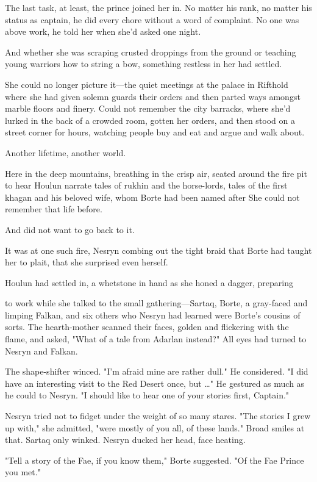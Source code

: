 The last task, at least, the prince joined her in. No matter his rank, no matter his status as captain, he did every chore without a word of complaint. No one was above work, he told her when she'd asked one night.

And whether she was scraping crusted droppings from the ground or teaching young warriors how to string a bow, something restless in her had settled.

She could no longer picture it---the quiet meetings at the palace in Rifthold where she had given solemn guards their orders and then parted ways amongst marble floors and finery. Could not remember the city barracks, where she'd lurked in the back of a crowded room, gotten her orders, and then stood on a street corner for hours, watching people buy and eat and argue and walk about.

Another lifetime, another world.

Here in the deep mountains, breathing in the crisp air, seated around the fire pit to hear Houlun narrate tales of rukhin and the horse-lords, tales of the first khagan and his beloved wife, whom Borte had been named after  She could not remember that life before.

And did not want to go back to it.

It was at one such fire, Nesryn combing out the tight braid that Borte had taught her to plait, that she surprised even herself.

Houlun had settled in, a whetstone in hand as she honed a dagger, preparing

to work while she talked to the small gathering---Sartaq, Borte, a gray-faced and limping Falkan, and six others who Nesryn had learned were Borte's cousins of sorts. The hearth-mother scanned their faces, golden and flickering with the flame, and asked, "What of a tale from Adarlan instead?" All eyes had turned to Nesryn and Falkan.

The shape-shifter winced. "I'm afraid mine are rather dull." He considered. "I did have an interesting visit to the Red Desert once, but \ldots" He gestured as much as he could to Nesryn. "I should like to hear one of your stories first, Captain."

Nesryn tried not to fidget under the weight of so many stares. "The stories I grew up with," she admitted, "were mostly of you all, of these lands." Broad smiles at that. Sartaq only winked. Nesryn ducked her head, face heating.

"Tell a story of the Fae, if you know them," Borte suggested. "Of the Fae Prince you met."


